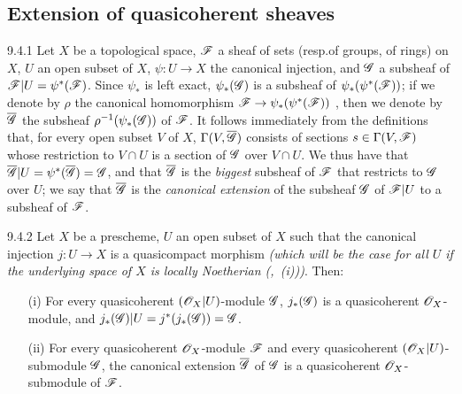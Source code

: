 \documentclass{book}
\begin{document}
\subsection{Extension of quasicoherent sheaves}
\label{1-schemes-9.4}        

\begin{env}{9.4.1}
\label{env-1.9.4.1}
Let $X$ be a topological space, $\mathscr{F}$ a
sheaf of sets (resp.of groups, of rings) on $X$, $U$ an open subset of $X$,
$\psi\colon U\to X$ the canonical injection, and $\mathscr{G}$ a subsheaf of
$\mathscr{F}|U=\psi^\ast(\mathscr{F})$. Since $\psi_\ast$ is left exact,
$\psi_\ast(\mathscr{G})$ is a subsheaf of $\psi_\ast(\psi^\ast(\mathscr{F}))$; if we denote
by $\rho$ the canonical homomorphism $\mathscr{F}\to\psi_\ast(\psi^\ast(\mathscr{F}))$
, then we denote by $\overline{\mathscr{G}}$ the subsheaf
$\rho^{-1}(\psi_\ast(\mathscr{G}))$ of $\mathscr{F}$. It follows immediately from the
definitions that, for every open subset $V$ of $X$,
$\Gamma(V,\overline{\mathscr{G}})$ consists of sections $s\in\Gamma(V,\mathscr{F})$
whose restriction to $V\cap U$ is a section of $\mathscr{G}$ over $V\cap U$. We
thus have that $\overline{\mathscr{G}}|U=\psi^\ast(\overline{\mathscr{G}})=\mathscr{G}$,
and that $\overline{\mathscr{G}}$ is the \emph{biggest} subsheaf of $\mathscr{F}$
that restricts to $\mathscr{G}$ over $U$; we say that $\overline{\mathscr{G}}$ is
the \emph{canonical extension} of the subsheaf $\mathscr{G}$ of $\mathscr{F}|U$ to a
subsheaf of $\mathscr{F}$.
\end{env}

\begin{envs}[Proposition]{9.4.2}
\label{prop-1.9.4.2}
Let $X$ be a prescheme, $U$ an open subset of $X$ such that the canonical injection
$j\colon U\to X$ is a quasicompact morphism \emph{(which will be the case for
\emph{all} $U$ if the underlying space of $X$ is \emph{locally Noetherian}
{\normalfont(,~(i))})}. Then:
\begin{itemize}
  \item[(i)] For every quasicoherent $(\mathscr{O}_X|U)$-module $\mathscr{G}$, $j_\ast(\mathscr{G})$
             is a quasicoherent $\mathscr{O}_X$-module, and
             $j_\ast(\mathscr{G})|U=j^\ast(j_\ast(\mathscr{G}))=\mathscr{G}$.
  \item[(ii)] For every quasicoherent $\mathscr{O}_X$-module $\mathscr{F}$ and every quasicoherent
              $(\mathscr{O}_X|U)$-submodule $\mathscr{G}$, the canonical extension
              $\overline{\mathscr{G}}$ of $\mathscr{G}$  is a
              quasicoherent $\mathscr{O}_X$-submodule of $\mathscr{F}$.
\end{itemize}
\end{envs}
\end{document}
